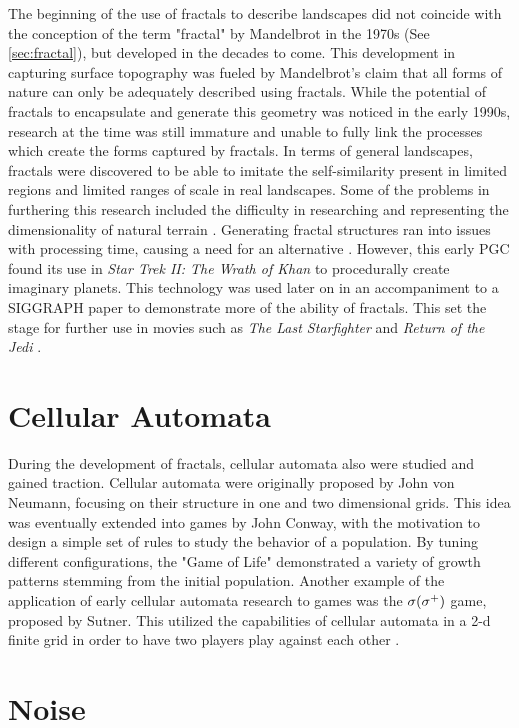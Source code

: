 \documentclass[10pt]{report}
\begin{document}
		The beginning of the use of fractals to describe landscapes did not coincide with the conception of the term "fractal" by Mandelbrot in the 1970s (See \autoref{sec:fractal}), but developed in the decades to come. This development in capturing surface topography was fueled by Mandelbrot's claim that all forms of nature can only be adequately described using fractals. While the potential of fractals to encapsulate and generate this geometry was noticed in the early 1990s, research at the time was still immature and unable to fully link the processes which create the forms captured by fractals. In terms of general landscapes, fractals were discovered to be able to imitate the self-similarity present in limited regions and limited ranges of scale in real landscapes. Some of the problems in furthering this research included the difficulty in researching and representing the dimensionality of natural terrain \cite{XU1993245}. Generating fractal structures ran into issues with processing time, causing a need for an alternative \cite{inbook}. However, this early PGC found its use in \emph{Star Trek II: The Wrath of Khan} \cite{startrek} to procedurally create imaginary planets. This technology was used later on in an accompaniment to a SIGGRAPH paper to demonstrate more of the ability of fractals. This set the stage for further use in movies such as \emph{The Last Starfighter} and \emph{Return of the Jedi} \cite{ibm-fractal}. 
		
		\section{Cellular Automata}
		
		During the development of fractals, cellular automata also were studied and gained traction. Cellular automata were originally proposed by John von Neumann, focusing on their structure in one and two dimensional grids. This idea was eventually extended into games by John Conway, with the motivation to design a simple set of rules to study the behavior of a population. By tuning different configurations, the "Game of Life" demonstrated a variety of growth patterns stemming from the initial population. Another example of the application of early cellular automata research to games was the \(\sigma(\sigma\textsuperscript{+})\) game, proposed by Sutner. This utilized the capabilities of cellular automata in a 2-d finite grid in order to have two players play against each other \cite{10.1145/349194.349202}.
		
		\section{Noise}
		
\end{document}
